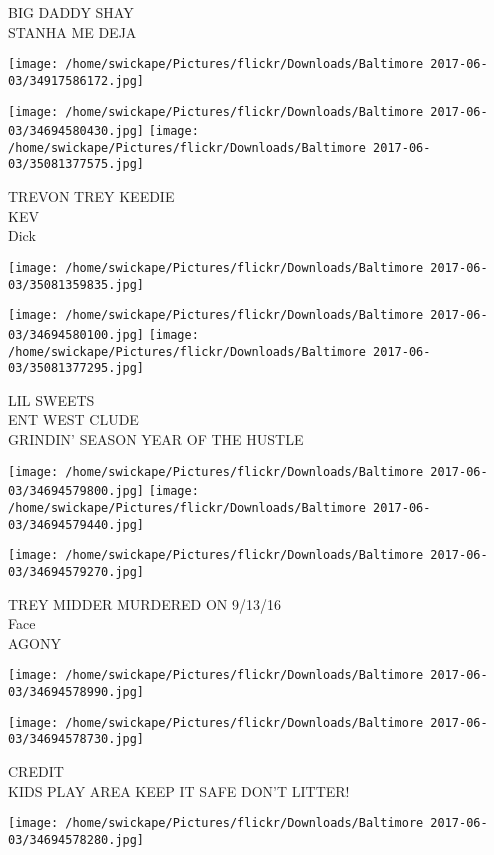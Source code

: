 \documentclass[10pt,letterpaper]{article}
\begin{document}
BIG DADDY SHAY\\
STANHA ME DEJA
\pagebreak

\texttt{[image: /home/swickape/Pictures/flickr/Downloads/Baltimore 2017-06-03/34917586172.jpg]}

\vspace{0.25in}
\texttt{[image: /home/swickape/Pictures/flickr/Downloads/Baltimore 2017-06-03/34694580430.jpg]}
\texttt{[image: /home/swickape/Pictures/flickr/Downloads/Baltimore 2017-06-03/35081377575.jpg]}

TREVON TREY KEEDIE\\
KEV\\
Dick
\pagebreak

\texttt{[image: /home/swickape/Pictures/flickr/Downloads/Baltimore 2017-06-03/35081359835.jpg]}

\vspace{0.25in}
\texttt{[image: /home/swickape/Pictures/flickr/Downloads/Baltimore 2017-06-03/34694580100.jpg]}
\texttt{[image: /home/swickape/Pictures/flickr/Downloads/Baltimore 2017-06-03/35081377295.jpg]}

LIL SWEETS\\
ENT WEST CLUDE\\
GRINDIN' SEASON YEAR OF THE HUSTLE
\pagebreak

\texttt{[image: /home/swickape/Pictures/flickr/Downloads/Baltimore 2017-06-03/34694579800.jpg]}
\texttt{[image: /home/swickape/Pictures/flickr/Downloads/Baltimore 2017-06-03/34694579440.jpg]}

\texttt{[image: /home/swickape/Pictures/flickr/Downloads/Baltimore 2017-06-03/34694579270.jpg]}

TREY MIDDER MURDERED ON 9/13/16\\
Face\\
AGONY
\pagebreak

\texttt{[image: /home/swickape/Pictures/flickr/Downloads/Baltimore 2017-06-03/34694578990.jpg]}

\vspace{0.25in}
\texttt{[image: /home/swickape/Pictures/flickr/Downloads/Baltimore 2017-06-03/34694578730.jpg]}

CREDIT\\
KIDS PLAY AREA KEEP IT SAFE DON'T LITTER!
\pagebreak

\texttt{[image: /home/swickape/Pictures/flickr/Downloads/Baltimore 2017-06-03/34694578280.jpg]}
\end{document}
